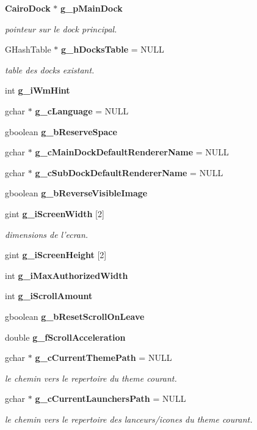 \begin{CompactItemize}
\item 
{\bf Cairo\-Dock} $\ast$ {\bf g\_\-p\-Main\-Dock}
\begin{CompactList}\small\item\em pointeur sur le dock principal. \item\end{CompactList}\item 
GHash\-Table $\ast$ {\bf g\_\-h\-Docks\-Table} = NULL
\begin{CompactList}\small\item\em table des docks existant. \item\end{CompactList}\item 
int {\bf g\_\-i\-Wm\-Hint}
\item 
gchar $\ast$ {\bf g\_\-c\-Language} = NULL
\item 
gboolean {\bf g\_\-b\-Reserve\-Space}
\item 
gchar $\ast$ {\bf g\_\-c\-Main\-Dock\-Default\-Renderer\-Name} = NULL
\item 
gchar $\ast$ {\bf g\_\-c\-Sub\-Dock\-Default\-Renderer\-Name} = NULL
\item 
gboolean {\bf g\_\-b\-Reverse\-Visible\-Image}
\item 
gint {\bf g\_\-i\-Screen\-Width} [2]
\begin{CompactList}\small\item\em dimensions de l'ecran. \item\end{CompactList}\item 
gint {\bf g\_\-i\-Screen\-Height} [2]
\item 
int {\bf g\_\-i\-Max\-Authorized\-Width}
\item 
int {\bf g\_\-i\-Scroll\-Amount}
\item 
gboolean {\bf g\_\-b\-Reset\-Scroll\-On\-Leave}
\item 
double {\bf g\_\-f\-Scroll\-Acceleration}
\item 
gchar $\ast$ {\bf g\_\-c\-Current\-Theme\-Path} = NULL
\begin{CompactList}\small\item\em le chemin vers le repertoire du theme courant. \item\end{CompactList}\item 
gchar $\ast$ {\bf g\_\-c\-Current\-Launchers\-Path} = NULL
\begin{CompactList}\small\item\em le chemin vers le repertoire des lanceurs/icones du theme courant. \item\end{CompactList}\item 

\end{CompactItemize}
